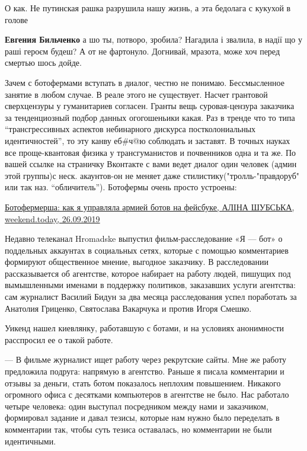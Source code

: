 \begin{itemize}
\begin{itemize}
О как. Не путинская рашка разрушила нашу жизнь, а эта бедолага с кукухой в голове

\textbf{Евгения Бильченко} а шо ты, потворо, зробила? Нагадила і звалила, в надії що у раші героєм будеш? А от не фартонуло. Догнивай, мразота, може хоч перед смертью шось дойде.
\end{itemize} %


Зачем с ботофермами вступать в диалог, честно не понимаю. Бессмысленное занятие в
любом случае. В реале этого не существует. Насчет грантовой сверхцензуры у
гуманитариев согласен. Гранты вещь суровая-цензура заказчика за тенденциозный
подбор данных огогошеньики какая. Раз в тренде что то типа \enquote{трансгрессивных
аспектов небинарного дискурса постколониальных идентичностей}, то эту канву
еб\#ч@ю соблюдать и заставят. В точных науках все проще-квантовая физика у
трансгуманистов и почвенников одна и та же. По вашей ссылке на страничку
Вконтакте с вами ведет диалог один человек (админ этой группы)с
неск. акаунтов-он не меняет даже стилистику("тролль-"правдоруб" или так
наз. \enquote{обличитель}). Ботофермы очень просто устроены:

\href{https://weekend.today/kolonki/botofermersha-kak-ja-upravljala-armiei-botov-na-feisbuke.htm}{%
Ботофермерша: как я управляла армией ботов на фейсбуке, %
АЛІНА ШУБСЬКА, weekend.today, 26.09.2019}

\begin{multicols}{2} %
Недавно телеканал Hromadske выпустил фильм-расследование «Я — бот» о поддельных
аккаунтах в социальных сетях, которые с помощью комментариев формируют
общественное мнение, выгодное заказчику. В расследовании рассказывается об
агентстве, которое набирает на работу людей, пишущих под вымышленными именами в
поддержку политиков, заказавших услуги агентства: сам журналист Василий Бидун
за два месяца расследования успел поработать за Анатолия Гриценко, Святослава
Вакарчука и против Игоря Смешко.

Уикенд нашел киевлянку, работавшую с ботами, и на условиях анонимности
расспросил ее о такой работе.

— В фильме журналист ищет работу через рекрутские сайты. Мне же работу
предложила подруга: напрямую в агентство. Раньше я писала комментарии и отзывы
за деньги, стать ботом показалось неплохим повышением. Никакого огромного офиса
с десятками компьютеров в агентстве не было. Нас работало четыре человека: один
выступал посредником между нами и заказчиком, формировал задание и давал
тезисы, которые нам нужно было переделать в комментарии так, чтобы суть тезиса
оставалась, но комментарии не были идентичными.


\end{multicols}
\end{itemize}
